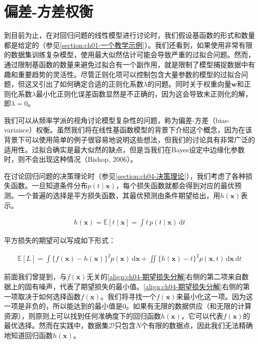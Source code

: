 \documentclass[../../main.tex]{subfiles}
\begin{document}
\section{偏差-方差权衡}\label{section:ch04-偏差方差权衡}

到目前为止，在对回归问题的线性模型进行讨论时，我们假设基函数的形式和数量都是给定的（参见\cref{section:ch01-一个教学示例}）。我们还看到，如果使用非常有限的数据集训练复杂模型，使用最大似然估计可能会导致严重的过拟合问题。然而，通过限制基函数的数量来避免过拟合有一个副作用，就是限制了模型捕捉数据中有趣和重要趋势的灵活性。尽管正则化项可以控制包含大量参数的模型的过拟合问题，但这又引出了如何确定合适的正则化系数$\lambda$的问题。同时关于权重向量$\boldsymbol{w}$和正则化系数$\lambda$最小化正则化误差函数显然是不正确的，因为这会导致未正则化的解，即$\lambda=0$。

我们可以从频率学派的视角讨论模型复杂性的问题，称为偏差-方差（bias-variance）权衡。虽然我们将在线性基函数模型的背景下介绍这个概念，因为在该背景下可以使用简单的例子很容易地说明这些想法，但我们的讨论具有非常广泛的适用性。过拟合确实是最大似然的缺点，但是当我们在Bayes设定中边缘化参数时，则不会出现这种情况（Bishop, 2006）。

在讨论回归问题的决策理论时（参见\cref{section:ch04-决策理论}），我们考虑了各种损失函数。一旦知道条件分布$p(t\mid\boldsymbol{x})$，每个损失函数就都会得到对应的最优预测。一个普遍的选择是平方损失函数，其最优预测由条件期望给出，用$h(\boldsymbol{x})$表示。

\begin{align}
  h(\boldsymbol{x})=\mathbb{E}[t\mid\boldsymbol{x}]=\int t\,p(t\mid\boldsymbol{x})\,\mathrm{d}t
  \label{align:ch04-回归函数h}
\end{align}

平方损失的期望可以写成如下形式：

\begin{align}
  \mathbb{E}[L]=\int\{f(\boldsymbol{x})-h(\boldsymbol{x})\}^2p(\boldsymbol{x})\,\mathrm{d}\boldsymbol{x}+\iint\{h(\boldsymbol{x})-t\}^2p(\boldsymbol{x},t)\,\mathrm{d}\boldsymbol{x}\,\mathrm{d}t
  \label{align:ch04-期望损失分解}
\end{align}

前面我们曾提到，与$f(\boldsymbol{x})$无关的\eqref{align:ch04-期望损失分解}右侧的第二项来自数据上的固有噪声，代表了期望损失的最小值。\eqref{align:ch04-期望损失分解}右侧的第一项取决于如何选择函数$f(\boldsymbol{x})$。我们将寻找一个$f(\boldsymbol{x})$来最小化这一项。因为这一项是非负的，所以能达到的最小值是$0$。如果有无限的数据供应（和无限的计算资源），则原则上可以找到任何准确度下的回归函数$h(\boldsymbol{x})$，它可以代表$f(\boldsymbol{x})$的最优选择。然而在实践中，数据集$\mathcal{D}$只包含$N$个有限的数据点，因此我们无法精确地知道回归函数$h(\boldsymbol{x})$。
\end{document}
